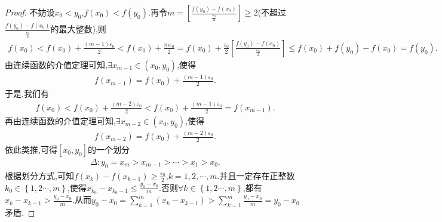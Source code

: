\documentclass[lang=cn,newtx,10pt,scheme=chinese]{../Template/elegantbook}
\begin{document}
\begin{proof}
        不妨设\(x_0<y_0\),\(f\left( x_0 \right) <f\left( y_0 \right)\).再令\(m=\left[ \frac{f\left( y_0 \right) -f\left( x_0 \right)}{\frac{\varepsilon _0}{2}} \right] \geqslant  2\)(不超过\(\frac{f\left( y_0 \right) -f\left( x_0 \right)}{\frac{\varepsilon _0}{2}}\)的最大整数),则
        \begin{align*}
            f\left( x_0 \right) <f\left( x_0 \right) +\frac{\left( m - 1 \right) \varepsilon _0}{2}<f\left( x_0 \right) +\frac{m\varepsilon _0}{2}=f\left( x_0 \right) +\frac{\varepsilon _0}{2}\left[ \frac{f\left( y_0 \right) -f\left( x_0 \right)}{\frac{\varepsilon _0}{2}} \right] \leqslant f\left( x_0 \right) +f\left( y_0 \right) -f\left( x_0 \right) =f\left( y_0 \right).
        \end{align*}
        由连续函数的介值定理可知,\(\exists x_{m - 1}\in \left( x_0,y_0 \right)\),使得
        \begin{align*}
           f\left( x_{m - 1} \right) =f\left( x_0 \right) +\frac{\left( m - 1 \right) \varepsilon _0}{2}.
        \end{align*}
        于是,我们有
        \begin{align*}
            f\left( x_0 \right) <f\left( x_0 \right) +\frac{\left( m - 2 \right) \varepsilon _0}{2}<f\left( x_0 \right) +\frac{\left( m - 1 \right) \varepsilon _0}{2}=f\left( x_{m - 1} \right).
        \end{align*}
        再由连续函数的介值定理可知,\(\exists x_{m - 2}\in \left( x_0,y_0 \right)\),使得
        \begin{align*}
            f\left( x_{m - 2} \right) =f\left( x_0 \right) +\frac{\left( m - 2 \right) \varepsilon _0}{2}.
        \end{align*}
        依此类推,可得\(\left[ x_0,y_0 \right]\)的一个划分
        \begin{align*}
            \Delta :y_0=x_m>x_{m - 1}>\cdots >x_1>x_0.
        \end{align*}
        根据划分方式,可知\(f\left( x_k \right) -f\left( x_{k - 1} \right) \geqslant  \frac{\varepsilon _0}{2}\),\(k = 1,2,\cdots,m\).并且一定存在正整数\(k_0\in \left\{ 1,2\cdots,m \right\}\),使得\(x_{k_0}-x_{k_0 - 1}\leqslant  \frac{y_0 - x_0}{m}\).否则\(\forall k\in \left\{ 1,2\cdots,m \right\}\),都有\(x_k - x_{k - 1}>\frac{y_0 - x_0}{m}\).从而\(y_0 - x_0=\sum_{k = 1}^m{\left( x_k - x_{k - 1} \right)}>\sum_{k = 1}^m{\frac{y_0 - x_0}{m}} = y_0 - x_0\)矛盾.
        

\end{proof}
\end{document}

